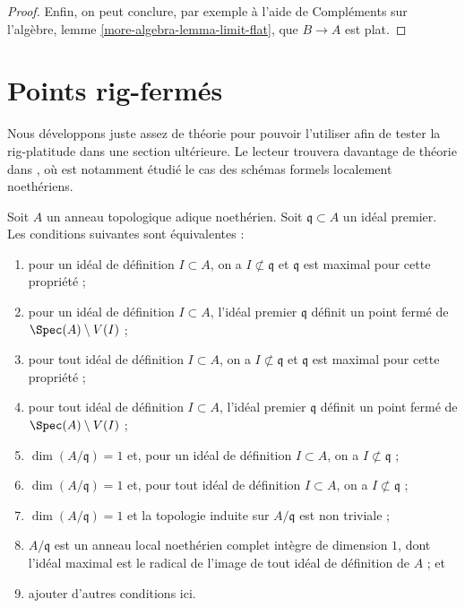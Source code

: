 \begin{proof}
\medskip\noindent
Enfin, on peut conclure, par exemple à l'aide de Compléments sur l'algèbre,
lemme \ref{more-algebra-lemma-limit-flat}, que $B \to A$ est plat.
\end{proof}





\section{Points rig-fermés}
\label{section-rig-points}

\noindent
Nous développons juste assez de théorie pour pouvoir l'utiliser afin de tester
la rig-platitude dans une section ultérieure. Le lecteur trouvera davantage
de théorie dans \cite{BL-I}, où est notamment étudié le cas des
schémas formels localement noethériens.

\begin{lemma}
\label{lemma-rig-point}
Soit $A$ un anneau topologique adique noethérien. Soit
$\mathfrak q \subset A$ un idéal premier. Les conditions suivantes sont
équivalentes :
\begin{enumerate}
\item pour un idéal de définition $I \subset A$, on a
$I \not \subset \mathfrak q$ et $\mathfrak q$ est maximal
pour cette propriété ;
\item pour un idéal de définition $I \subset A$, l'idéal premier
$\mathfrak q$ définit un point fermé de $\Spec(A) \setminus V(I)$ ;
\item pour tout idéal de définition $I \subset A$, on a
$I \not \subset \mathfrak q$ et $\mathfrak q$ est maximal
pour cette propriété ;
\item pour tout idéal de définition $I \subset A$, l'idéal premier
$\mathfrak q$ définit un point fermé de $\Spec(A) \setminus V(I)$ ;
\item $\dim(A/\mathfrak q) = 1$ et, pour un idéal de définition
$I \subset A$, on a $I \not \subset \mathfrak q$ ;
\item $\dim(A/\mathfrak q) = 1$ et, pour tout idéal de définition
$I \subset A$, on a $I \not \subset \mathfrak q$ ;
\item $\dim(A/\mathfrak q) = 1$ et la topologie induite
sur $A/\mathfrak q$ est non triviale ;
\item $A/\mathfrak q$ est un anneau local noethérien complet intègre
de dimension $1$, dont l'idéal maximal est le radical de l'image de tout idéal
de définition de $A$ ; et
\item ajouter d'autres conditions ici.
\end{enumerate}
\end{lemma}

